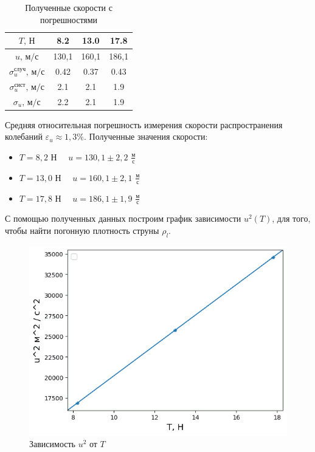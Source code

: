 \documentclass[
a4paper, %
12pt, %
]{article}
\begin{document}
	\begin{table}[h]
		\begin{center}
			\begin{tabular}{|c|c|c|c|}
				\hline
				$T\text{, Н}$ & 8.2 & 13.0 & 17.8\\ \hline
				$u\text{, м/с}$  & 130,1 & 160,1 & 186,1 \\ \hline
				$\sigma_{u}^{\text{случ}} \text{, м/с}$ & 0.42 & 0.37 & 0.43  \\ \hline
				$\sigma_{u}^{\text{сист}} \text{, м/с}$ & 2.1 & 2.1 & 1.9 \\ \hline
				$\sigma_{u} \text{, м/с}$ & 2.2 & 2.1 & 1.9 \\ \hline
			\end{tabular}
			\caption{Полученные скорости с погрешностями}
		\end{center}
	\end{table}
	
	\noindent
	Средняя относительная погрешность измерения скорости распространения колебаний $\varepsilon_u \approx 1,3\% $. Полученные значения скорости:
	
	\begin{itemize}
		\item $T = 8,2$ Н  $\quad u = 130,1 \pm 2,2$ $\frac{\text{м}}{\text{с}}$
		\item  $T = 13,0$ Н  $\quad u = 160,1 \pm 2,1$ $\frac{\text{м}}{\text{с}}$
		\item  $T = 17,8$ Н  $\quad u = 186,1 \pm 1,9$ $\frac{\text{м}}{\text{с}}$
	\end{itemize}
	
	С помощью полученных данных построим график зависимости $u^2(T)$, для того, чтобы найти погонную плотность струны $ \rho_l $.
	
	\begin{figure}[h!]
		\begin{center}
			\includegraphics[scale=0.68]{graph_u_T.png}
			\caption{Зависимость $ u^2 $ от $ T $}
			\label{graph_u_T}
		\end{center}
	\end{figure}
	
\end{document}
